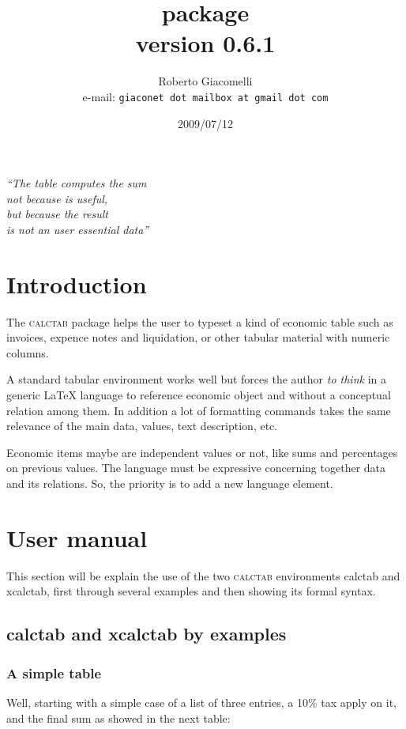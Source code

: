 \documentclass[a4paper]{article}
\author{Roberto Giacomelli\\
e-mail: \texttt{giaconet dot mailbox at gmail dot com}}
\date{2009/07/12}
\title{\ct{} package\\version 0.6.1}
\newcommand{\ct}{\textsc{calctab}} %
\newcommand{\env}[1]{\textsf{#1}}
\begin{document}
\maketitle

\bigskip
\hspace*{238pt}\begin{minipage}{125pt}\em
``The table computes the sum\\
not because is useful,\\
but because the result\\
is not an user essential data''
\end{minipage}

\vfill
\begin{center}
\begin{minipage}{112mm}%
\tableofcontents
\end{minipage}
\end{center}
\vfill
\newpage
%
%
%
\section{Introduction}
The \ct{} package helps the user to typeset a kind of economic table such as invoices, expence notes and liquidation, or other tabular material with numeric columns.

A standard \env{tabular} environment works well but forces the author \emph{to think} in a generic \LaTeX{} language to reference economic object and without a conceptual relation among them. In addition a lot of formatting commands takes the same relevance of the main data, values, text description, etc.

Economic items maybe are independent values or not, like sums and percentages on previous values. The language must be expressive concerning together data and its relations. So, the priority is to add a new language element.

%
%
%
\section{User manual}
This section will be explain the use of the two \ct{} environments \env{calctab} and \env{xcalctab}, first through several examples and then showing its formal syntax.

%
%
%
\subsection{\env{calctab} and \env{xcalctab} by examples}
%
\subsubsection{A simple table}
Well, starting with a simple case of a list of three entries, a 10\% tax apply on it, and the final sum as showed in the next table:
\end{document}
